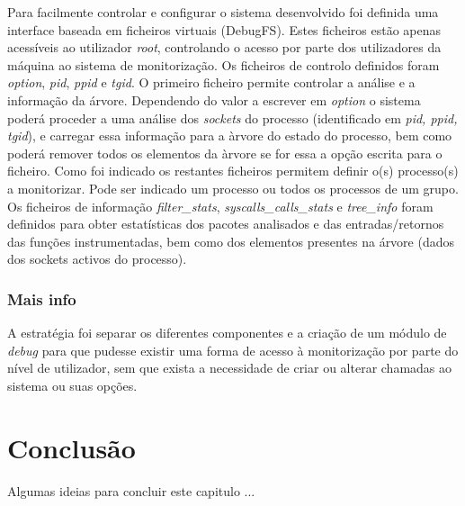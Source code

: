 Para facilmente controlar e configurar o sistema desenvolvido foi definida uma interface baseada em ficheiros virtuais (DebugFS).
 Estes ficheiros estão apenas acessíveis ao utilizador \textit{root}, controlando o acesso por parte dos utilizadores da máquina ao sistema de monitorização.
 Os ficheiros de controlo definidos foram \textit{option}, \textit{pid}, \textit{ppid} e \textit{tgid}.
 O primeiro ficheiro permite controlar a análise e a informação da árvore.
 Dependendo do valor a escrever em \textit{option} o sistema poderá proceder a uma análise dos \textit{sockets} do processo (identificado em \textit{pid, ppid, tgid}), e carregar essa informação para a àrvore do estado do processo, bem como poderá remover todos os elementos da àrvore se for essa a opção escrita para o ficheiro.
 Como foi indicado os restantes ficheiros permitem definir o(s) processo(s) a monitorizar.
 Pode ser indicado um processo ou todos os processos de um grupo.
 Os ficheiros de informação \textit{filter\_stats}, \textit{syscalls\_calls\_stats} e \textit{tree\_info} foram definidos para obter estatísticas dos pacotes analisados e das entradas/retornos das funções instrumentadas, bem como dos elementos presentes na árvore (dados dos sockets activos do processo).

\subsubsection{Mais info}
A estratégia foi separar os diferentes componentes e a criação de um módulo de \textit{debug} para que pudesse existir uma forma de acesso à monitorização por parte do nível de utilizador, sem que exista a necessidade de criar ou alterar chamadas ao sistema ou suas opções.



\section{Conclusão}

Algumas ideias para concluir este capitulo ...

